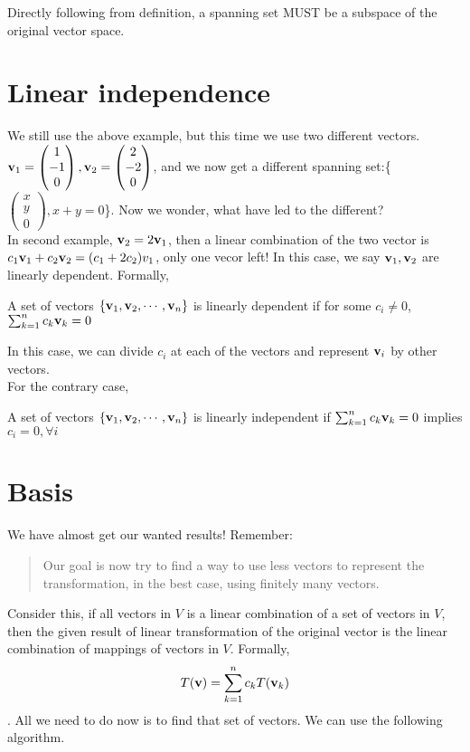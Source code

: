 Directly following from definition, a spanning set MUST be a subspace of the original vector space.

\section{Linear independence}
We still use the above example, but this time we use two different vectors. 
$\mathbf{v}_1 = \begin{pmatrix}
    1\\
    -1\\
    0
\end{pmatrix},\mathbf{v}_2 = \begin{pmatrix}
    2\\
    -2\\
    0
\end{pmatrix}$, and we now get a different spanning set:\{$\begin{pmatrix}
    x\\
    y\\
    0
\end{pmatrix},x+y = 0$\}. Now we wonder, what have led to the different?\\
In second example, $\mathbf{v}_2 = 2\mathbf{v}_1$, then a linear combination of the two vector is $c_1\mathbf{v}_1 + c_2\mathbf{v}_2 = (c_1+2c_2)v_1$, only one vecor left! In this case, we say $\mathbf{v}_1,\mathbf{v}_2$ are linearly dependent. Formally,\\
\begin{definition}
    A set of vectors $\{\mathbf{v}_1,\mathbf{v}_2,\cdots,\mathbf{v}_n\}$ is linearly dependent if for some $c_i \neq 0$, $\sum_{k = 1}^n c_k\mathbf{v}_k = 0$
\end{definition}
In this case, we can divide $c_i$ at each of the vectors and represent $\mathbf{v}_i$ by other vectors.\\
For the contrary case,
\begin{definition}
    A set of vectors $\{\mathbf{v}_1,\mathbf{v}_2,\cdots,\mathbf{v}_n\}$ is linearly independent if $\sum_{k = 1}^n c_k\mathbf{v}_k = 0$ implies $c_i = 0 ,\forall i$
\end{definition}

\section{Basis}
We have almost get our wanted results! Remember:
\begin{quote}
    Our goal is now try to find a way to use less vectors to represent the transformation, in the best case, using finitely many vectors.
\end{quote}
Consider this, if all vectors in $V$ is a linear combination of a set of vectors in $V$, then the given result of linear transformation of the original vector is the linear combination of mappings of vectors in $V$. Formally,
$$T(\mathbf{v}) = \sum_{k = 1}^n c_kT(\mathbf{v}_k)$$. 
All we need to do now is to find that set of vectors. We can use the following algorithm.

